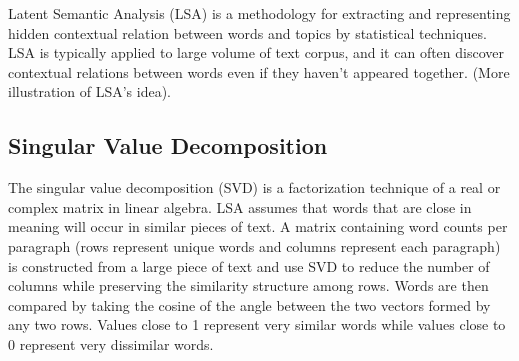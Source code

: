 Latent Semantic Analysis (LSA) is a methodology for extracting and representing hidden contextual relation between words and topics by statistical techniques\cite{landauer1998introduction}. LSA is typically applied to large volume of text corpus, and it can often discover contextual relations between words even if they haven't appeared together. (More illustration of LSA's idea). 

\subsection{Singular Value Decomposition}
The singular value decomposition (SVD) is a factorization technique of a real or complex matrix in linear algebra. LSA assumes that words that are close in meaning will occur in similar pieces of text. A matrix containing word counts per paragraph (rows represent unique words and columns represent each paragraph) is constructed from a large piece of text and use SVD to reduce the number of columns while preserving the similarity structure among rows. Words are then compared by taking the cosine of the angle between the two vectors formed by any two rows. Values close to 1 represent very similar words while values close to 0 represent very dissimilar words. \cite{dumais1995latent}
